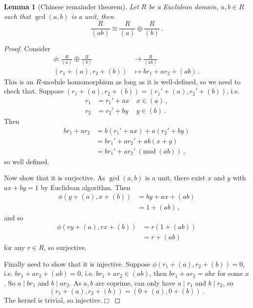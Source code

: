 \documentclass{article}
\theoremstyle{plain}\theoremheaderfont{\normalfont\itshape}\theorembodyfont{\rmfamily}\theoremseparator{.}\newtheorem*{rem}{Remark}\newtheorem*{ex}{Example}\newtheorem*{proof}{Proof}\newtheorem*{altp}{Alternative proof}\newtheorem*{nonex}{Non-Example}
\theoremstyle{plain}\theoremheaderfont{\normalfont\bfseries}\theorembodyfont{\rmfamily}\theoremseparator{.}\newtheorem{thm}{Theorem}[section]\newtheorem{lem}[thm]{Lemma}\newtheorem{prop}[thm]{Proposition}\newtheorem*{cor}{Corollary}\newtheorem{defn}[thm]{Definition}\newtheorem{clm}[thm]{Claim}\newtheorem{clminproof}{Claim}\newtheorem*{notn}{Notation}\newtheorem*{exer}{Exercise}\newtheorem*{lemnn}{Lemma}
\theoremstyle{break}\theoremheaderfont{\normalfont\itshape}\theorembodyfont{\rmfamily}\theoremseparator{.\medskip}\newtheorem*{proofskip}{Proof}\newtheorem*{exs}{Examples}\newtheorem*{rems}{Remarks}\newtheorem*{obs}{Observations}
\theoremstyle{break}\theoremheaderfont{\normalfont\bfseries}\theorembodyfont{\rmfamily}\theoremseparator{.\medskip}\newtheorem{lemskip}[thm]{Lemma}\newtheorem{defnskip}[thm]{Definition}\newtheorem{propskip}[thm]{Proposition}\newtheorem{thmskip}[thm]{Theorem}
\numberwithin{equation}{section}
\newcommand{\qed}{\hfill\ensuremath{\Box}}
\newcommand{\MOD}[1]{\ (\mathrm{mod} \ #1)}
\begin{document}
    \begin{lem}[Chinese remainder theorem]
        Let \(R\) be a Euclidean domain, \(a,b\in R\) such that \(\gcd(a,b)\) is a unit, then
        \[\frac{R}{(ab)}\cong\frac{R}{(a)}\oplus\frac{R}{(b)}\,.\]
    \end{lem}
    \begin{proof}
        Consider
        \begin{align*}
            \phi:\frac{R}{(a)}\oplus\frac{R}{(b)}&\longrightarrow\frac{R}{(ab)}\\
            (r_1+(a),r_2+(b))&\longmapsto br_1+ar_2+(ab)\,.
        \end{align*}
        This is an \(R\)-module homomorphism as long as it is well-defined, so we need to check that. Suppose \((r_1+(a),r_2+(b))=(r_1'+(a),r_2'+(b))\), i.e.
        \begin{align*}
            r_1&=r_1'+ax\quad x\in(a)\,,\\
            r_2&=r_2'+by\quad\, y\in(b)\,.
        \end{align*}
        Then
        \begin{align*}
            br_1+ar_2&=b(r_1'+ax)+a(r_2'+by)\\
            &=br_1'+ar_2'+ab(x+y)\\
            &=br_1'+ar_2'\MOD{(ab)}\,,
        \end{align*}
        so well defined.

        Now show that it is surjective. As \(\gcd(a,b)\) is a unit, there exist \(x\) and \(y\) with \(ax+by=1\) by Euclidean algorithm. Then
        \begin{align*}
            \phi(y+(a),x+(b))&=by+ax+(ab)\\
            &=1+(ab)\,,
        \end{align*}
        and so
        \begin{align*}
            \phi(ry+(a),rx+(b))&=r(1+(ab))\\
            &=r+(ab)
        \end{align*}
        for any \(r\in R\), so surjective.

        Finally need to show that it is injective. Suppose \(\phi(r_1+(a),r_2+(b))=0\), i.e. \(br_1+ar_2+(ab)=0\), i.e. \(br_1+ar_2\in (ab)\), then \(br_1+ar_2=abx\) for some \(x\). So \(a\mid br_1\) and \(b\mid ar_2\). As \(a,b\) are coprime, can only have \(a\mid r_1\) and \(b\mid r_2\), so
        \[(r_1+(a),r_2+(b))=(0+(a),0+(b))\,.\]
        The kernel is trivial, so injective.\qed
    \end{proof}
\end{document}
